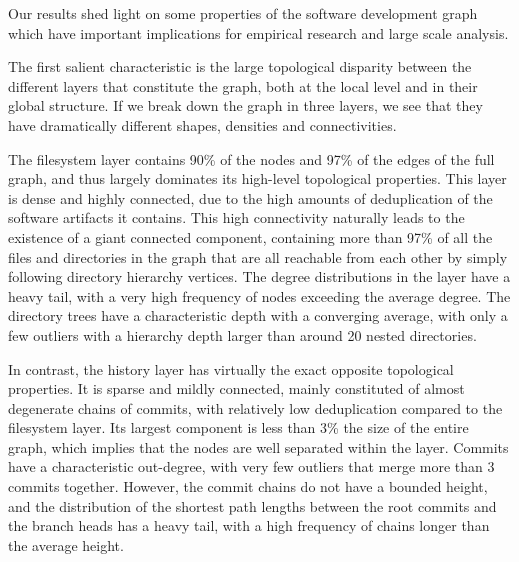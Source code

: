 Our results shed light on some properties of the software development graph
which have important implications for empirical research and large scale
analysis.

The first salient characteristic is the large topological disparity between the
different layers that constitute the graph, both at the local level and in
their global structure. If we break down the graph in three layers, we see that
they have dramatically different shapes, densities and connectivities.

The filesystem layer contains 90\% of the nodes and 97\% of the edges of the
full graph, and thus largely dominates its high-level topological properties.
This layer is dense and highly connected, due to the high amounts of
deduplication of the software artifacts it contains. This high connectivity
naturally leads to the existence of a giant connected component, containing
more than 97\% of all the files and directories in the graph that are all
reachable from each other by simply following directory hierarchy vertices.
The degree distributions in the layer have a heavy tail, with a very high
frequency of nodes exceeding the average degree.
The directory trees have a characteristic depth with a converging average, with
only a few outliers with a hierarchy depth larger than around 20 nested
directories.

In contrast, the history layer has virtually the exact opposite topological
properties. It is sparse and mildly connected, mainly constituted of almost
degenerate chains of commits, with relatively low deduplication compared to the
filesystem layer. Its largest component is less than 3\% the size of the entire
graph, which implies that the nodes are well separated within the layer.
Commits have a characteristic out-degree, with very few outliers that merge
more than 3 commits together. However, the commit chains do not have a bounded
height, and the distribution of the shortest path lengths between the root
commits and the branch heads has a heavy tail, with a high frequency of chains
longer than the average height.

